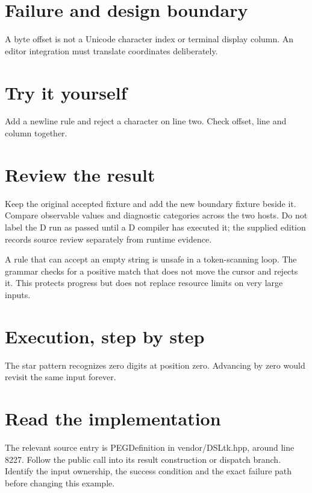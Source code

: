 
\section*{Failure and design boundary}
A byte offset is not a Unicode character index or terminal display column. An editor integration must translate coordinates deliberately.

\section*{Try it yourself}
Add a newline rule and reject a character on line two. Check offset, line and column together.

\section*{Review the result}
Keep the original accepted fixture and add the new boundary fixture beside it. Compare observable values and diagnostic categories across the two hosts. Do not label the D run as passed until a D compiler has executed it; the supplied edition records source review separately from runtime evidence.

\clearpage
{}
A rule that can accept an empty string is unsafe in a token-scanning loop. The grammar checks for a positive match that does not move the cursor and rejects it. This protects progress but does not replace resource limits on very large inputs.


\section*{Execution, step by step}
The star pattern recognizes zero digits at position zero. Advancing by zero would revisit the same input forever.

\section*{Read the implementation}
The relevant source entry is PEGDefinition in vendor/DSLtk.hpp, around line 8227. Follow the public call into its result construction or dispatch branch. Identify the input ownership, the success condition and the exact failure path before changing this example.

